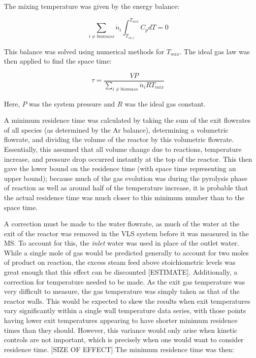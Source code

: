 \documentclass[11pt,twocolumn]{article}
\begin{document}
The mixing temperature was given by the energy balance:

\begin{equation}
	\sum_{i \ne biomass}\dot{n}_{i}\int_{T_{in,i}}^{T_{mix}}C_{p}dT = 0
\end{equation}

This balance was solved using numerical methods for $T_{mix}$. The ideal gas law was then applied to find the space time:

\begin{equation}
	\tau = \frac{VP}{\sum_{i \ne biomass}\dot{n}_{i}RT_{mix}}
\end{equation}

Here, $P$ was the system pressure and $R$ was the ideal gas constant.

A minimum residence time was calculated by taking the sum of the exit flowrates of all species (as determined by the Ar balance), determining a volumetric flowrate, and dividing the volume of the reactor by this volumetric flowrate.  Essentially, this assumed that all volume change due to reactions, temperature increase, and pressure drop occurred instantly at the top of the reactor.  This then gave the lower bound on the residence time (with space time representing an upper bound); because much of the gas evolution was during the pyrolysis phase of reaction as well as around half of the temperature increase, it is probable that the actual residence time was much closer to this minimum number than to the space time.  

A correction must be made to the water flowrate, as much of the water at the exit of the reactor was removed in the VLS system before it was measured in the MS.  To account for this, the \emph{inlet} water was used in place of the outlet water.  While a single mole of gas would be predicted generally to account for two moles of product on reaction, the excess steam feed above stoichiometric levels was great enough that this effect can be discounted [ESTIMATE].  Additionally, a correction for temperature needed to be made.  As the exit gas temperature was very difficult to measure, the gas temperature was simply taken as that of the reactor walls.  This would be expected to skew the results when exit temperatures vary significantly within a single wall temperature data series, with those points having lower exit temperatures appearing to have shorter minimum residence times than they should.  However, this variance would only arise when kinetic controls are not important, which is precisely when one would want to consider residence time. [SIZE OF EFFECT]  The minimum residence time was then:
\end{document}
